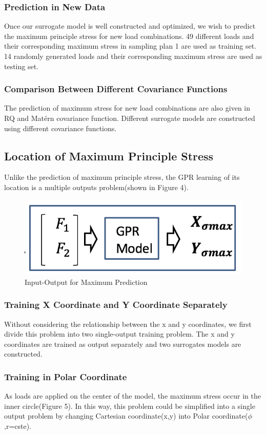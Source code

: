 \documentclass[conference]{IEEEtran}
\begin{document}
\subsubsection{Prediction in New Data} Once our surrogate model is well constructed and optimized, we wish to predict the maximum principle stress for new load combinations. 49 different loads and their corresponding maximum stress in sampling plan 1 are used as training set. 14 randomly generated loads and their corresponding maximum stress are used as testing set. 

\subsubsection{Comparison Between Different Covariance Functions} The prediction of maximum stress for new load combinations are also given in RQ and Matérn covariance function. Different surrogate models are constructed using different covariance functions. 

\subsection{Location of Maximum Principle Stress}
Unlike the prediction of maximum principle stress, the GPR learning of its location is a multiple outputs problem(shown in Figure 4).

\begin{figure} 
\centering
\includegraphics[width=2 in,height=0.8 in]{IO2-2.png}
\caption{Input-Output for Maximum Prediction}
\label{fig:graph}
\end{figure}

\subsubsection{Training X Coordinate and Y Coordinate Separately} Without considering the relationship between the x and y coordinates, we first divide this problem into two single-output training problem. The x and y coordinates are trained as output separately and two surrogates models are constructed.  

\subsubsection{Training in Polar Coordinate} As loads are applied on the center of the model, the maximum stress occur in the inner circle(Figure 5). In this way, this problem could be simplified into a single output problem by changing Cartesian coordinate(x,y) into Polar coordinate($\phi$,r=cste).
\end{document}

